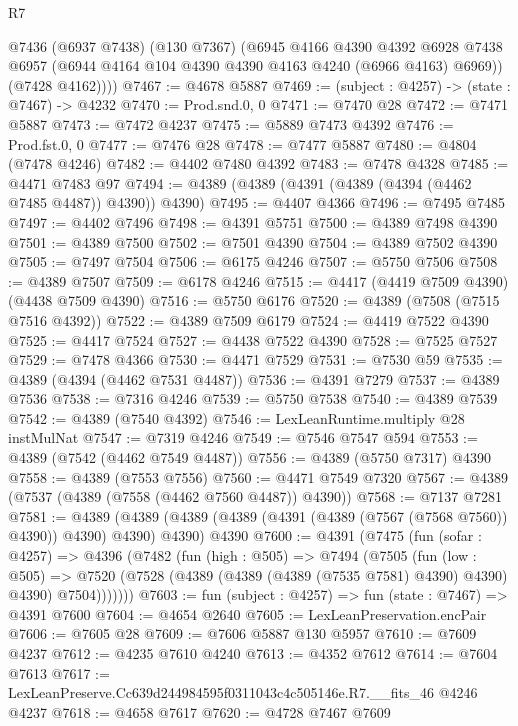 \begin{lexlean}{R7}
\begin{coremodule}
        @7436
          (@6937 @7438)
          (@130 @7367)
          (@6945
            @4166
            @4390
            @4392
            @6928
            @7438
            @6957
            (@6944 @4164 @104 @4390 @4390 @4163 @4240 (@6966 @4163) @6969))
          (@7428 @4162))))
@7467 := @4678 @5887
@7469 := (subject : @4257) -> (state : @7467) -> @4232
@7470 := Prod.snd.{0, 0}
@7471 := @7470 @28
@7472 := @7471 @5887
@7473 := @7472 @4237
@7475 := @5889 @7473 @4392
@7476 := Prod.fst.{0, 0}
@7477 := @7476 @28
@7478 := @7477 @5887
@7480 := @4804 (@7478 @4246)
@7482 := @4402 @7480 @4392
@7483 := @7478 @4328
@7485 := @4471 @7483 @97
@7494 := @4389 (@4389 (@4391 (@4389 (@4394 (@4462 @7485 @4487)) @4390)) @4390)
@7495 := @4407 @4366
@7496 := @7495 @7485
@7497 := @4402 @7496
@7498 := @4391 @5751
@7500 := @4389 @7498 @4390
@7501 := @4389 @7500
@7502 := @7501 @4390
@7504 := @4389 @7502 @4390
@7505 := @7497 @7504
@7506 := @6175 @4246
@7507 := @5750 @7506
@7508 := @4389 @7507
@7509 := @6178 @4246
@7515 := @4417 (@4419 @7509 @4390) (@4438 @7509 @4390)
@7516 := @5750 @6176
@7520 := @4389 (@7508 (@7515 @7516 @4392))
@7522 := @4389 @7509 @6179
@7524 := @4419 @7522 @4390
@7525 := @4417 @7524
@7527 := @4438 @7522 @4390
@7528 := @7525 @7527
@7529 := @7478 @4366
@7530 := @4471 @7529
@7531 := @7530 @59
@7535 := @4389 (@4394 (@4462 @7531 @4487))
@7536 := @4391 @7279
@7537 := @4389 @7536
@7538 := @7316 @4246
@7539 := @5750 @7538
@7540 := @4389 @7539
@7542 := @4389 (@7540 @4392)
@7546 := LexLeanRuntime.multiply @28 instMulNat
@7547 := @7319 @4246
@7549 := @7546 @7547 @594
@7553 := @4389 (@7542 (@4462 @7549 @4487))
@7556 := @4389 (@5750 @7317) @4390
@7558 := @4389 (@7553 @7556)
@7560 := @4471 @7549 @7320
@7567 := @4389 (@7537 (@4389 (@7558 (@4462 @7560 @4487)) @4390))
@7568 := @7137 @7281
@7581 := @4389
    (@4389 (@4389 (@4389 (@4391 (@4389 (@7567 (@7568 @7560)) @4390)) @4390) @4390) @4390)
    @4390
@7600 := @4391
    (@7475
      (fun (sofar : @4257) =>
      @4396
        (@7482
          (fun (high : @505) =>
          @7494
            (@7505
              (fun (low : @505) =>
              @7520 (@7528 (@4389 (@4389 (@4389 (@7535 @7581) @4390) @4390) @4390) @7504)))))))
@7603 := fun (subject : @4257) => fun (state : @7467) => @4391 @7600
@7604 := @4654 @2640
@7605 := LexLeanPreservation.encPair
@7606 := @7605 @28
@7609 := @7606 @5887 @130 @5957
@7610 := @7609 @4237
@7612 := @4235 @7610 @4240
@7613 := @4352 @7612
@7614 := @7604 @7613
@7617 := LexLeanPreserve.Cc639d244984595f0311043c4c505146e.R7.__fits_46 @4246 @4237
@7618 := @4658 @7617
@7620 := @4728 @7467 @7609

\end{coremodule}
\end{lexlean}
